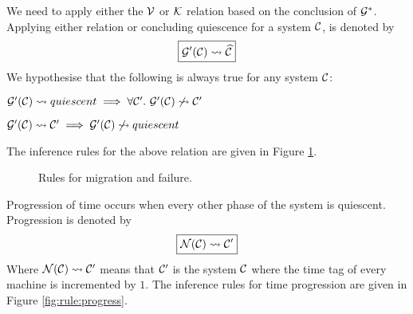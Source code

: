 We need to apply either the $\mathcal{V}$ or $\mathcal{K}$ relation based on the conclusion of
$\mathcal{G}^*$. Applying either relation or concluding quiescence for a system $\mathcal{C}$, is
denoted by
\begin{equation*}
\boxed{\mathcal{G}'(\mathcal{C}) \leadsto \widehat{\mathcal{C}}}
\end{equation*}
We hypothesise that the following is always true for any system $\mathcal{C}$:
\begin{theorem}
$\mathcal{G}'(\mathcal{C}) \leadsto quiescent \implies \forall \mathcal{C}'.~ \mathcal{G}'(\mathcal{C}) \not\leadsto \mathcal{C}'$
\end{theorem}
\begin{theorem}
$\mathcal{G}'(\mathcal{C}) \leadsto \mathcal{C}' \implies \mathcal{G}'(\mathcal{C}) \not\leadsto quiescent$
\end{theorem}
The inference rules for the above relation are given in Figure
\ref{fig:rule:mighalt}.

\begin{figure}[!ht]
\caption{Rules for migration and failure.}\label{fig:rule:mighalt}
\end{figure}

Progression of time occurs when every other phase of the system is quiescent.
Progression is denoted by
\begin{equation*}
\boxed{\mathcal{N}(\mathcal{C}) \leadsto \mathcal{C}'}
\end{equation*}
Where $\mathcal{N}(\mathcal{C}) \leadsto \mathcal{C}'$ means that $\mathcal{C}'$ is the system $\mathcal{C}$ where the time
tag of every machine is incremented by $1$. The inference rules for time
progression are given in Figure \ref{fig:rule:progress}.


